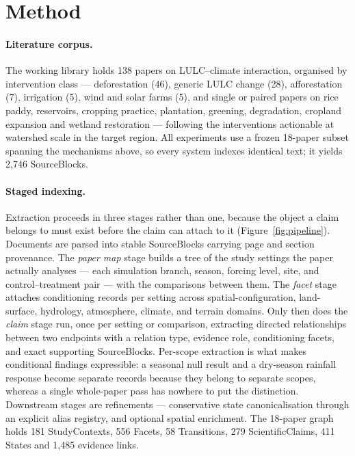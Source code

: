 \documentclass{article}
\begin{document}
\section{Method}
\label{sec:method}

\paragraph{Literature corpus.}
The working library holds 138 papers on LULC--climate interaction, organised by
intervention class --- deforestation (46), generic LULC change (28), afforestation (7),
irrigation (5), wind and solar farms (5), and single or paired papers on rice paddy,
reservoirs, cropping practice, plantation, greening, degradation, cropland expansion and
wetland restoration --- following the interventions actionable at watershed scale in the
target region. All experiments use a frozen 18-paper subset spanning the mechanisms
above, so every system indexes identical text; it yields 2{,}746 SourceBlocks.

\paragraph{Staged indexing.}
Extraction proceeds in three stages rather than one, because the object a claim
belongs to must exist before the claim can attach to it (Figure~\ref{fig:pipeline}).
Documents are parsed into stable SourceBlocks carrying page and section provenance.
The \emph{paper map} stage builds a tree of the study settings the paper actually
analyses --- each simulation branch, season, forcing level, site, and
control--treatment pair --- with the comparisons between them. The \emph{facet}
stage attaches conditioning records per setting across spatial-configuration,
land-surface, hydrology, atmosphere, climate, and terrain domains. Only then does
the \emph{claim} stage run, once per setting or comparison, extracting directed
relationships between two endpoints with a relation type, evidence role,
conditioning facets, and exact supporting SourceBlocks. Per-scope extraction is what
makes conditional findings expressible: a seasonal null result and a dry-season rainfall
response become separate records because they belong to separate scopes, whereas a
single whole-paper pass has nowhere to put the distinction. Downstream stages are
refinements --- conservative state canonicalisation through an explicit alias registry,
and optional spatial enrichment. The 18-paper graph holds 181 StudyContexts, 556 Facets,
58 Transitions, 279 ScientificClaims, 411 States and 1{,}485 evidence links.
\end{document}
